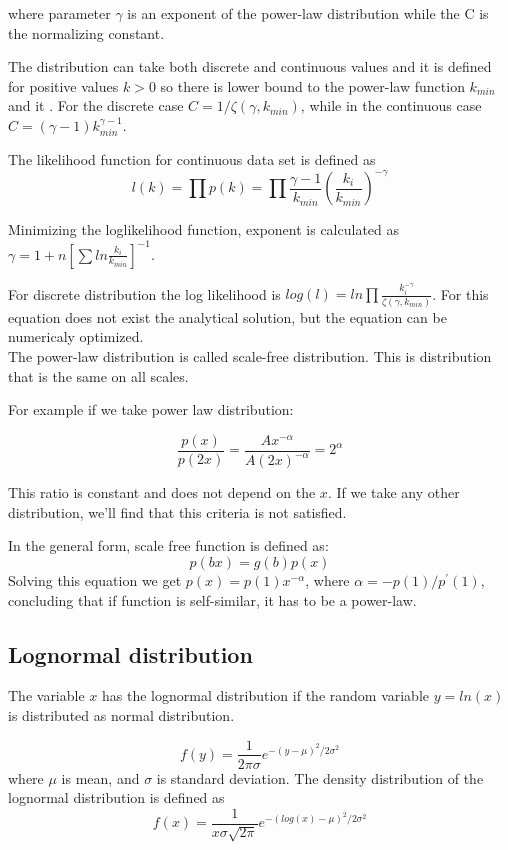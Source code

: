 where parameter $\gamma$ is an exponent of the power-law distribution while the C is the normalizing constant. 

The distribution can take both discrete and continuous values and it is defined for positive values $k>0$ so there is lower bound to the power-law function $k_{min}$ and it . For the discrete case $C=1/\zeta(\gamma, k_{min})$, while in the continuous case $C=(\gamma-1)k_{min}^{\gamma-1}$. 

The likelihood function for continuous data set is defined as 
\begin{equation}
l(k) = \prod p(k) = \prod \frac{\gamma - 1}{ k_{min}}(\frac{k_i}{k_{min}})^{-\gamma}
\end{equation}

Minimizing the loglikelihood function, exponent is calculated as $\gamma = 1+n[\sum ln \frac{k_i}{k_{min}} ]^{-1}$. 

For discrete distribution the log likelihood is $log(l) = ln\prod \frac{k_i^{-\gamma}}{\zeta(\gamma, k_{min})}$. For this equation does not exist the analytical solution, but the equation can be numericaly optimized. \\

The power-law distribution is called scale-free distribution. This is distribution that is the same on all scales. 

For example if we take power law distribution:

$$\frac{p(x)}{p(2x)} = \frac{Ax^{-\alpha}}{A(2x)^{-\alpha}} = 2^{\alpha}$$ 

This ratio is constant and does not depend on the $x$. If we take any other distribution, we'll find that this criteria is not satisfied. 

In the general form, scale free function is defined as:
$$p(bx) = g(b)p(x)$$ 
Solving this equation we get $p(x)=p(1)x^{-\alpha}$, where $\alpha=-p(1)/p^{'}(1)$, concluding that if function is self-similar, it has to be a power-law. 





\subsection{Lognormal distribution}

The variable $x$ has the lognormal distribution if the random variable $y=ln(x)$ is distributed as normal distribution. 

\begin{equation}
f(y) = \frac{1}{2\pi\sigma}e^{-(y-\mu)^2/2\sigma^2}
\end{equation}
where $\mu$ is mean, and $\sigma$ is standard deviation. The density distribution of the lognormal distribution is defined as
\begin{equation}
f(x) = \frac{1}{x \sigma \sqrt{2\pi}}e^{-(log(x)-\mu)^2 /2\sigma^2} 
\end{equation}

